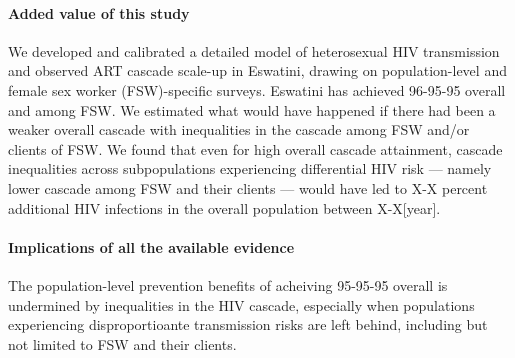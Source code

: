 \begin{ric}
  \paragraph{Added value of this study}
  We developed and calibrated a detailed model of heterosexual HIV transmission %
  and observed ART cascade scale-up in Eswatini,
  drawing on population-level and female sex worker (FSW)-specific surveys.
Eswatini has achieved 96-95-95 overall and among FSW. We estimated what would have happened
if there had been a weaker overall cascade with inequalities in the cascade among FSW and/or clients of FSW. %
 We found that even for high overall cascade attainment, %
  cascade inequalities across subpopulations experiencing differential HIV risk
  --- namely lower cascade among FSW and their clients ---
  would have led to X-X percent additional HIV infections in the overall population between X-X[year]. %
  \paragraph{Implications of all the available evidence} %
The population-level prevention benefits of acheiving 95-95-95 overall is undermined  %
by inequalities in the HIV cascade, especially when 
populations experiencing disproportioante transmission risks are left behind, 
including but not limited to FSW and their clients.
\end{ric}
